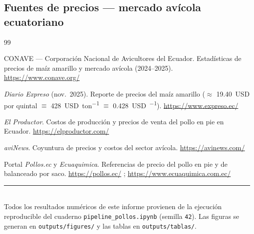 \documentclass[11pt,a4paper]{article}
\begin{document}
\subsection*{Fuentes de precios — mercado avícola ecuatoriano}
\begin{thebibliography}{99}
\setlength{\itemsep}{2pt}

 CONAVE — Corporación Nacional de Avicultores del Ecuador. Estadísticas de precios de
maíz amarillo y mercado avícola (2024--2025). \url{https://www.conave.org/}

 \emph{Diario Expreso} (nov.\ 2025). Reporte de precios del maíz amarillo
($\approx$ \SI{19.40}{USD} por quintal $\equiv$ \SI{428}{USD\per ton} $\equiv$ \SI{0.428}{USD\per\kilo}).
\url{https://www.expreso.ec/}

 \emph{El Productor}. Costos de producción y precios de venta del pollo en pie en
Ecuador. \url{https://elproductor.com/}

 \emph{aviNews}. Coyuntura de precios y costos del sector avícola.
\url{https://avinews.com/}

 Portal \emph{Pollos.ec} y \emph{Ecuaquimica}. Referencias de precio del pollo en pie
y de balanceado por saco. \url{https://pollos.ec/} ; \url{https://www.ecuaquimica.com.ec/}
\end{thebibliography}

\vspace{0.5cm}
\noindent\rule{\linewidth}{0.4pt}\\[2pt]
{\footnotesize Todos los resultados numéricos de este informe provienen de la ejecución reproducible del
cuaderno \texttt{pipeline\_pollos.ipynb} (semilla \texttt{42}). Las figuras se generan en
\texttt{outputs/figures/} y las tablas en \texttt{outputs/tablas/}.}
\end{document}
